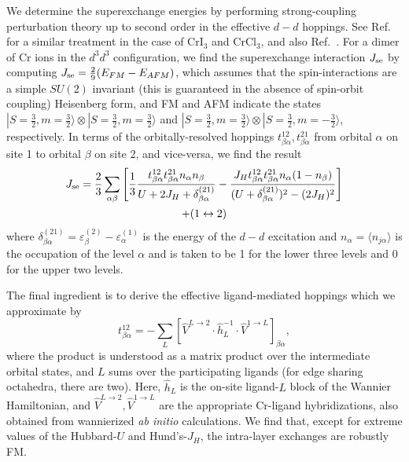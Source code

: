 \documentclass[aps,prl,showpacs,twocolumn,superscriptaddress,floatfix]{revtex4-2}
\begin{document}
We determine the superexchange energies by performing strong-coupling perturbation theory up to second order in the effective $d-d$ hoppings.
See Ref.~ for a similar treatment in the case of CrI$_3$ and CrCl$_3$, and also Ref.~.
For a dimer of Cr ions in the $d^3d^3$ configuration, we find the superexchange interaction $J_{\rm se}$ by computing $J_{\rm se} = \frac29 (E_{FM} - E_{AFM})$, which assumes that the spin-interactions are a simple $SU(2)$ invariant (this is guaranteed in the absence of spin-orbit coupling) Heisenberg form, and FM and AFM indicate the states $|S = \frac32, m = \frac32\rangle \otimes |S = \frac32, m = \frac32\rangle $ and $|S = \frac32, m = \frac32\rangle \otimes |S = \frac32, m = -\frac32\rangle $, respectively.
In terms of the orbitally-resolved hoppings $t_{\beta\alpha}^{1 2}, t_{\beta\alpha}^{2 1}$ from orbital $\alpha$ on site 1 to orbital $\beta$ on site 2, and vice-versa, we find the result 
\begin{multline}
    J_{\rm se} = \frac23 \sum_{\alpha \beta}\left[ \frac13 \frac{ t_{\beta\alpha}^{1 2} t_{\beta \alpha}^{2 1} n_\alpha n_\beta}{U + 2J_H + \delta_{\beta \alpha}^{(21)} } -  \frac{J_H t_{\beta\alpha}^{1 2} t_{\beta \alpha}^{2 1} n_\alpha (1-n_\beta)}{(U  +\delta_{\beta \alpha}^{(21)} )^2 - (2J_H)^2} \right] \\
    + (1\leftrightarrow 2)
\end{multline}
where $\delta_{\beta \alpha}^{(21)} = \varepsilon_\beta^{(2)} - \varepsilon_\alpha^{(1)}$ is the energy of the $d-d$ excitation and $n_\alpha = \langle n_{j\alpha}\rangle$ is the occupation of the level $\alpha$ and is taken to be 1 for the lower three levels and 0 for the upper two levels.

The final ingredient is to derive the effective ligand-mediated hoppings which we approximate by 
\begin{equation}
    t^{12}_{\beta \alpha} = -\sum_{L} \left[ \hat{V}^{L\to 2}\cdot \hat{h}_L^{-1} \cdot \hat{V}^{1\to L}  \right]_{\beta\alpha},
\end{equation}
where the product is understood as a matrix product over the intermediate orbital states, and $L$ sums over the participating ligands (for edge sharing octahedra, there are two).
Here, $\hat{h}_L$ is the on-site ligand-$L$ block of the Wannier Hamiltonian, and $\hat{V}^{L\to 2}, \hat{V}^{1\to L}$ are the appropriate Cr-ligand hybridizations, also obtained from wannierized {\it ab initio} calculations.
We find that, except for extreme values of the Hubbard-$U$ and Hund's-$J_H$, the intra-layer exchanges are robustly FM.
\end{document}
